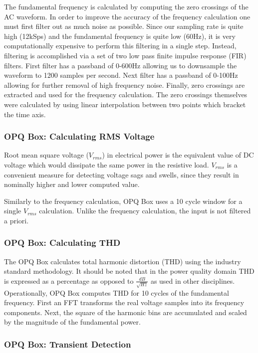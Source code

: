 The fundamental frequency is calculated by computing the zero crossings of the AC waveform.
In order to improve the accuracy of the frequency calculation one must first filter out as much noise as possible.
Since our sampling rate is quite high (12kSps) and the fundamental frequency is quite low (60Hz), it is very computationally expensive to perform this filtering in a single step.
Instead, filtering is accomplished via a set of two low pass finite impulse response (FIR) filters.
First filter has a passband of 0-600Hz allowing us to downsample the waveform to 1200 samples per second.
Next filter has a passband of 0-100Hz allowing for further removal of high frequency noise.
Finally, zero crossings are extracted and used for the frequency calculation.
The zero crossings themselves were calculated by using linear interpolation between two points which bracket the time axis.

\subsubsection{OPQ Box: Calculating RMS Voltage}\label{subsec:root-mean-square-voltage}

Root mean square voltage ($V_{rms}$) in electrical power is the equivalent value of DC voltage which would dissipate the same power in the resistive load. $V_{rms}$ is a convenient measure for detecting voltage sags and swells, since they result in nominally higher and lower computed value.

Similarly to the frequency calculation, OPQ Box uses a 10 cycle window for a single $V_{rms}$ calculation. Unlike the frequency calculation, the input is not filtered a priori.

\subsubsection{OPQ Box: Calculating THD}\label{subsec:thd}

The OPQ Box calculates total harmonic distortion (THD) using the industry standard methodology.
It should be noted that in the power quality domain THD is expressed as a percentage as opposed to $\frac{dB}{\sqrt{Hz}}$ as used in other disciplines.
Operationally, OPQ Box computes THD for 10 cycles of the fundamental frequency.
First an FFT transforms the real voltage samples into its frequency components.
Next, the square of the harmonic bins are accumulated and scaled by the magnitude of the fundamental power.

\subsubsection{OPQ Box: Transient Detection}\label{subsec:transient-detection}

